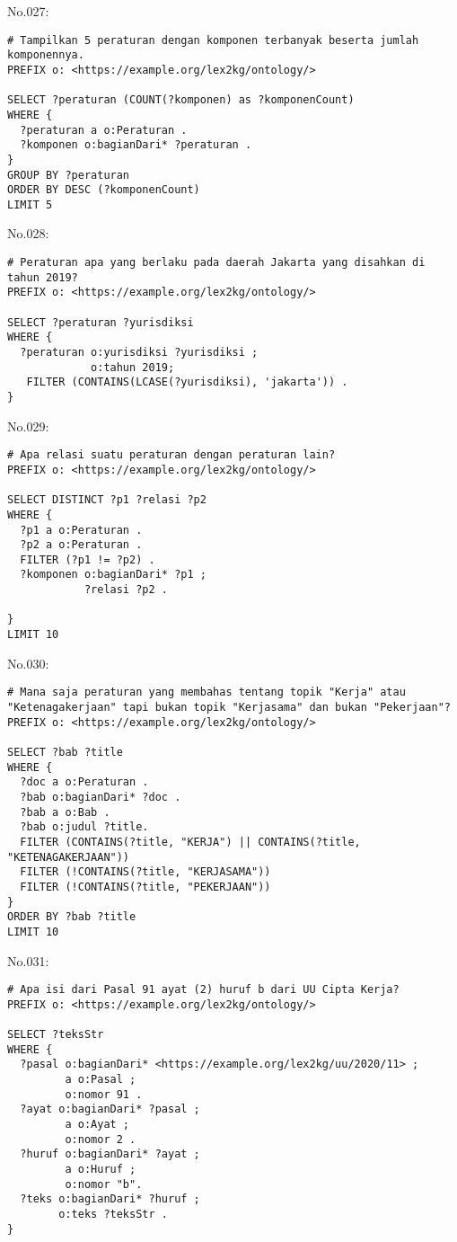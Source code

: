 \noindent No.027:
\begin{lstlisting}
# Tampilkan 5 peraturan dengan komponen terbanyak beserta jumlah komponennya.
PREFIX o: <https://example.org/lex2kg/ontology/>

SELECT ?peraturan (COUNT(?komponen) as ?komponenCount)
WHERE {
  ?peraturan a o:Peraturan .
  ?komponen o:bagianDari* ?peraturan .
}
GROUP BY ?peraturan
ORDER BY DESC (?komponenCount)
LIMIT 5

\end{lstlisting}


\noindent No.028:
\begin{lstlisting}
# Peraturan apa yang berlaku pada daerah Jakarta yang disahkan di tahun 2019?
PREFIX o: <https://example.org/lex2kg/ontology/>

SELECT ?peraturan ?yurisdiksi
WHERE {
  ?peraturan o:yurisdiksi ?yurisdiksi ;
             o:tahun 2019;
   FILTER (CONTAINS(LCASE(?yurisdiksi), 'jakarta')) .
}
\end{lstlisting}


\noindent No.029:
\begin{lstlisting}
# Apa relasi suatu peraturan dengan peraturan lain?
PREFIX o: <https://example.org/lex2kg/ontology/>

SELECT DISTINCT ?p1 ?relasi ?p2
WHERE {
  ?p1 a o:Peraturan .
  ?p2 a o:Peraturan .
  FILTER (?p1 != ?p2) .
  ?komponen o:bagianDari* ?p1 ;
            ?relasi ?p2 .

}
LIMIT 10
\end{lstlisting}


\noindent No.030:
\begin{lstlisting}
# Mana saja peraturan yang membahas tentang topik "Kerja" atau "Ketenagakerjaan" tapi bukan topik "Kerjasama" dan bukan "Pekerjaan"?
PREFIX o: <https://example.org/lex2kg/ontology/>

SELECT ?bab ?title
WHERE {
  ?doc a o:Peraturan .
  ?bab o:bagianDari* ?doc .
  ?bab a o:Bab .
  ?bab o:judul ?title.
  FILTER (CONTAINS(?title, "KERJA") || CONTAINS(?title, "KETENAGAKERJAAN"))
  FILTER (!CONTAINS(?title, "KERJASAMA"))
  FILTER (!CONTAINS(?title, "PEKERJAAN"))
}
ORDER BY ?bab ?title
LIMIT 10
\end{lstlisting}


\noindent No.031:
\begin{lstlisting}
# Apa isi dari Pasal 91 ayat (2) huruf b dari UU Cipta Kerja?
PREFIX o: <https://example.org/lex2kg/ontology/>

SELECT ?teksStr
WHERE {
  ?pasal o:bagianDari* <https://example.org/lex2kg/uu/2020/11> ;
         a o:Pasal ;
         o:nomor 91 .
  ?ayat o:bagianDari* ?pasal ;
         a o:Ayat ;
         o:nomor 2 .
  ?huruf o:bagianDari* ?ayat ;
         a o:Huruf ;
         o:nomor "b".
  ?teks o:bagianDari* ?huruf ;
        o:teks ?teksStr .
}
\end{lstlisting}



